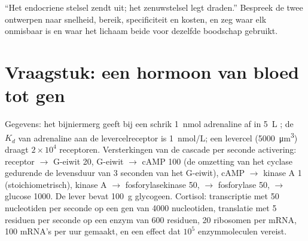 \begin{exercise}[$\star\star\star$]\label{exo:b2:cell-signalling:12}
``Het endocriene stelsel zendt uit; het zenuwstelsel legt draden.''
Bespreek de twee ontwerpen naar snelheid, bereik, specificiteit en kosten,
en zeg waar elk onmisbaar is en waar het lichaam beide voor dezelfde
boodschap gebruikt.
\end{exercise}

\section{Vraagstuk: een hormoon van bloed tot gen}

\begin{problem}
\label{pb:b2:cell-signalling:1}
Gegevens: het bijniermerg geeft bij een schrik \qty{1}{nmol} adrenaline af in
\qty{5}{L} ; de $K_d$ van adrenaline aan de levercelreceptor is
\qty{1}{nmol/L}; een levercel (\qty{5000}{\micro m^3}) draagt
$2\times 10^{4}$ receptoren. Versterkingen van de cascade per seconde
activering: receptor $\to$ G-eiwit 20, G-eiwit $\to$ cAMP 100
(de omzetting van het cyclase gedurende de levensduur van 3 seconden van het
G-eiwit), cAMP $\to$ kinase A 1 (stoichiometrisch), kinase A $\to$
fosforylasekinase 50, $\to$ fosforylase 50, $\to$ glucose 1000. De lever
bevat \qty{100}{g} glycogeen. Cortisol: transcriptie met
\qty{50}{} nucleotiden per seconde op een gen van \qty{4000}{}
nucleotiden, translatie met \qty{5}{} residuen per seconde op een enzym van
\num{600} residuen, \num{20} ribosomen per mRNA, \num{100}
mRNA's per uur gemaakt, en een effect dat $10^{5}$ enzymmoleculen vereist.


\end{problem}
